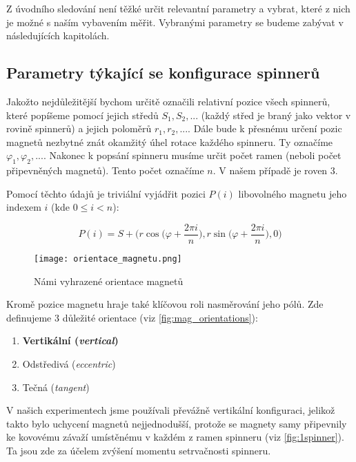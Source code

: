 Z úvodního sledování není těžké určit relevantní parametry a vybrat, které z nich je možné s naším vybavením měřit. Vybranými parametry se budeme zabývat v následujících kapitolách.

\subsection{Parametry týkající se konfigurace spinnerů}
\label{sub:param_konf}
Jakožto nejdůležitější bychom určitě označili relativní pozice všech spinnerů, které popíšeme pomocí jejich středů $S_1, S_2,...$ (každý střed je braný jako vektor v rovině spinnerů) a jejich poloměrů $r_1, r_2, ...$.
Dále bude k přesnému určení pozic magnetů nezbytné znát okamžitý úhel rotace každého spinneru. Ty označíme $\varphi_1, \varphi_2,...$.
Nakonec k popsání spinneru musíme určit počet ramen (neboli počet připevněných magnetů). Tento počet označíme $n$. V našem případě je roven 3.

Pomocí těchto údajů je triviální vyjádřit pozici $P(i)$ libovolného magnetu jeho indexem $i$ (kde $0 \leq i < n$):

\begin{equation}
    \label{eq:magnet_pos}
    P(i) = S + \biggr(r\cos{\bigg(\varphi + \frac{2\pi i}{n}\bigg)},
    r\sin{\bigg(\varphi+\frac{2\pi i}{n}}\bigg), 0 \bigg)
\end{equation}

\begin{wrapfigure}{r}{0.4\textwidth}
    \vspace*{-0.5cm}
    \texttt{[image: orientace\_magnetu.png]}
    \centering
    \caption{Námi vyhrazené orientace magnetů}
    \label{fig:mag_orientations}
\end{wrapfigure}

Kromě pozice magnetu hraje také klíčovou roli nasměrování jeho pólů. Zde definujeme 3 důležité orientace (viz \autoref{fig:mag_orientations}):

\begin{enumerate}[topsep=0pt, partopsep=0pt]
    \setlength{\itemsep}{0pt}%
    \setlength{\parskip}{0pt}%
    \item \textbf{Vertikální (\textit{vertical})}
    \item Odstředivá (\textit{eccentric})
    \item Tečná (\textit{tangent})
\end{enumerate}

V našich experimentech jsme používali převážně vertikální konfiguraci, jelikož takto bylo uchycení magnetů nejjednodušší, protože se magnety samy připevnily ke kovovému závaží umístěnému v každém z ramen spinneru (viz \autoref{fig:1spinner}). Ta jsou zde za účelem zvýšení momentu setrvačnosti spinneru.

